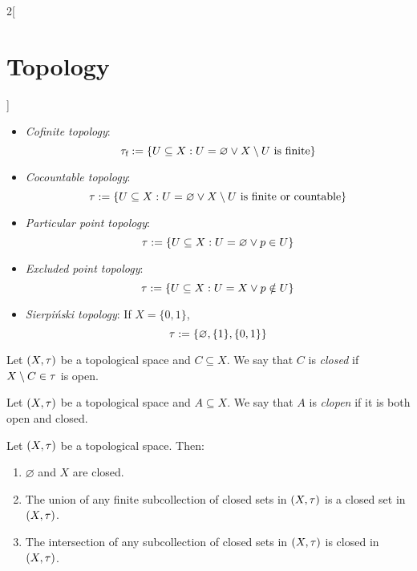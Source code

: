 \documentclass[../../../main.tex]{subfiles}
\begin{document}
\begin{multicols}{2}[\section{Topology}]
\begin{prop}
\begin{itemize}
            \item \emph{Cofinite topology}: $$\tau_\text{f}:=\{U\subseteq X:U=\varnothing\lor X\setminus U\text{ is finite}\}$$
            \item \emph{Cocountable topology}:
                  \begin{equation*}
                      \tau:=\{U\subseteq X:U=\varnothing\lor X\setminus U\text{ is finite or countable}\}
                  \end{equation*}
            \item \emph{Particular point topology}: $$\tau:=\{U\subseteq X:U=\varnothing\lor p\in U\}$$
            \item \emph{Excluded point topology}: $$\tau:=\{U\subseteq X:U=X\lor p\notin U\}$$
            \item \emph{Sierpiński topology}: If $X=\{0,1\}$, $$\tau:=\{\varnothing,\{1\},\{0,1\}\}$$
        \end{itemize}
    \end{prop}
    \begin{definition}
        Let $(X,\tau)$ be a topological space and $C\subseteq X$. We say that $C$ is \emph{closed} if $X\setminus C\in\tau$ is open.
    \end{definition}
    \begin{definition}
        Let $(X,\tau)$ be a topological space and $A\subseteq X$. We say that $A$ is \emph{clopen} if it is both open and closed.
    \end{definition}
    \begin{prop}
        Let $(X,\tau)$ be a topological space. Then:
        \begin{enumerate}
            \item $\varnothing$ and $X$ are closed.
            \item The union of any finite subcollection of closed sets in $(X,\tau)$ is a closed set in $(X,\tau)$.
            \item The intersection of any subcollection of closed sets in $(X,\tau)$ is closed in $(X,\tau)$.
        \end{enumerate}
    \end{prop}

\end{multicols}
\end{document}
